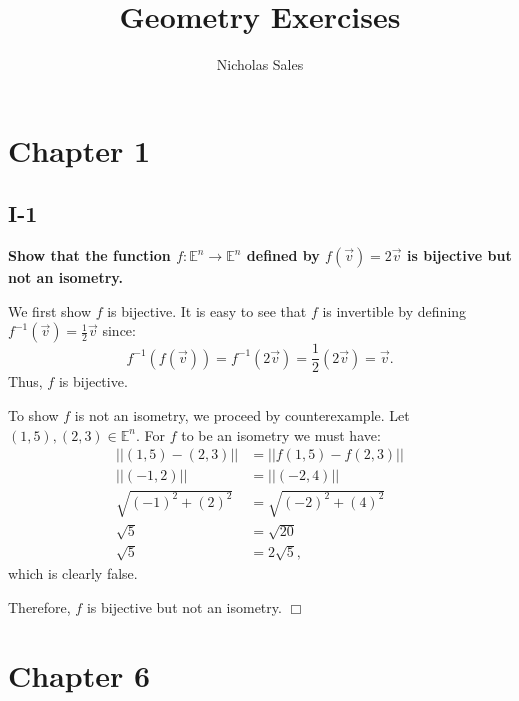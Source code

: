 \documentclass[11pt, a4paper]{article}
\title{Geometry Exercises}
\author{Nicholas Sales}
\date{}
\begin{document}
\maketitle 
\tableofcontents

\newpage

\section{Chapter 1}

\subsection{I-1}

\textbf{Show that the function $f : \mathbb{E}^n \rightarrow \mathbb{E}^n$ defined by $f(\vec{v}) = 2 \vec{v}$ is bijective but not an isometry.}

We first show $f$ is bijective. It is easy to see that $f$ is invertible by defining $f^{-1}(\vec{v}) = \frac{1}{2} \vec{v}$ since:
\[
  f^{-1}(f(\vec{v})) = f^{-1}(2 \vec{v}) = \frac{1}{2} (2 \vec{v}) = \vec{v}.
\]
Thus, $f$ is bijective.

To show $f$ is not an isometry, we proceed by counterexample. Let $(1, 5), (2, 3) \in \mathbb{E}^n$. For $f$ to be an isometry we must have:
\begin{align*}
  || (1, 5) - (2, 3) || &= || f(1, 5) - f(2, 3) || \\
  || (-1, 2) ||         &= || (-2, 4) || \\
  \sqrt{(-1)^2 + (2)^2} &= \sqrt{(-2)^2 + (4)^2} \\
  \sqrt{5}              &= \sqrt {20} \\
  \sqrt{5}              &= 2 \sqrt {5},
\end{align*}
which is clearly false. 

Therefore, $f$ is bijective but not an isometry. $\Box$

\section{Chapter 6}
\end{document}
